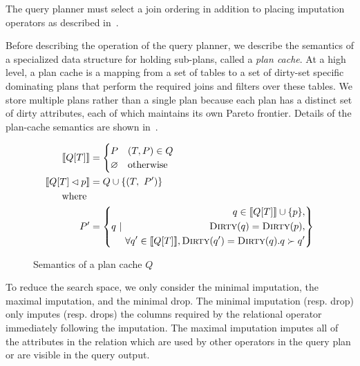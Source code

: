 The query planner must select a join ordering in addition to placing imputation operators as described in~.

Before describing the operation of the query planner, we describe the semantics of a specialized data structure for holding sub-plans, called a \emph{plan cache}.
At a high level, a plan cache is a mapping from a set of tables to a set of dirty-set specific dominating plans that perform the required joins and filters over these tables.
We store multiple plans rather than a single plan because each plan has a distinct set of dirty attributes, each of which maintains its own Pareto frontier. 
Details of the plan-cache semantics are shown in~.


\begin{figure}
  \begin{align*}
    \llbracket Q[T] \rrbracket &= \begin{cases}
      P & (T, P) \in Q \\
      \varnothing & \text{otherwise} \\
    \end{cases} \\
    \llbracket Q[T] \lhd p \rrbracket &= \begin{aligned} Q \cup \{(T,\ P') \} \end{aligned}\\
                                            \text{ where } \\
                                           P' &= \left\{q ~|~ \begin{aligned}
                                                                     q \in \llbracket Q[T] \rrbracket \cup \{p\}, \\
                                                                     \textsc{Dirty}(q) = \textsc{Dirty}(p),\\
                                                                     \forall q' \in \llbracket Q[T] \rrbracket, \textsc{Dirty}(q')=\textsc{Dirty}(q).  q \succ q' 
                                                                   \end{aligned}
                                           \right\}
  \end{align*}
  \caption{Semantics of a plan cache $Q$}
  \label{fig:semantics-plan-cache}
\end{figure}

To reduce the search space, we only consider the minimal imputation, the maximal imputation, and the minimal drop. The minimal imputation (resp. drop) only imputes (resp. drops) the columns required by the relational operator immediately following the imputation. The maximal imputation imputes all of the attributes in the relation which are used by other operators in the query plan or are visible in the query output.

